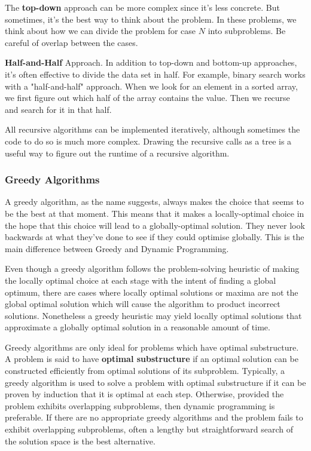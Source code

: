 \documentclass{article}
\begin{document}
    The \textbf{top-down} approach can be more complex since it's less concrete. But sometimes, it's the best way to think about the problem. In these problems, we think about how we can divide the problem for case $N$ into subproblems. Be careful of overlap between the cases. 
    
    \textbf{Half-and-Half} Approach. In addition to top-down and bottom-up approaches, it's often effective to divide the data set in half. For example, binary search works with a "half-and-half" approach. When we look for an element in a sorted array, we first figure out which half of the array contains the value. Then we recurse and search for it in that half.
    
    All recursive algorithms can be implemented iteratively, although sometimes the code to do so is much more complex. Drawing the recursive calls as a tree is a useful way to figure out the runtime of a recursive algorithm. 
    
    \subsubsection{Greedy Algorithms}
    A greedy algorithm, as the name suggests, always makes the choice that seems to be the best at that moment. This means that it makes a locally-optimal choice in the hope that this choice will lead to a globally-optimal solution. They never look backwards at what they’ve done to see if they could optimise globally. This is the main difference between Greedy and Dynamic Programming.

    Even though a greedy algorithm follows the problem-solving heuristic of making the locally optimal choice at each stage with the intent of finding a global optimum, there are cases where locally optimal solutions or maxima are not the global optimal solution which will cause the algorithm to product incorrect solutions. Nonetheless a greedy heuristic may yield locally optimal solutions that approximate a globally optimal solution in a reasonable amount of time.
    
    Greedy algorithms are only ideal for problems which have optimal substructure. A problem is said to have \textbf{optimal substructure} if an optimal solution can be constructed efficiently from optimal solutions of its subproblem. Typically, a greedy algorithm is used to solve a problem with optimal substructure if it can be proven by induction that it is optimal at each step. Otherwise, provided the problem exhibits overlapping subproblems, then dynamic programming is preferable. If there are no appropriate greedy algorithms and the problem fails to exhibit overlapping subproblems, often a lengthy but straightforward search of the solution space is the best alternative.
    
\end{document}

